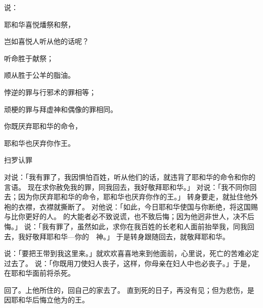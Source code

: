 {说：
\par }{\Q 耶和华喜悦燔祭和{}祭，
\par }{\Q 岂如喜悦人听从他的话呢？
\par }{\Q 听命胜于献祭；
\par }{\Q 顺从胜于公羊的脂油。
\par }{\Q {}悖逆的罪与行邪术的罪相等；
\par }{\Q 顽梗的罪与拜虚神和偶像的罪相同。
\par }{\Q 你既厌弃耶和华的命令，
\par }{\Q 耶和华也厌弃你作王。
\par }{\SH 扫罗认罪
\par }{\PP {}对{}说：「我有罪了，我因惧怕百姓，听从他们的话，就违背了耶和华的命令和你的言语。
现在求你赦免我的罪，同我回去，我好敬拜耶和华。」
对{}说：「我不同你回去；因为你厌弃耶和华的命令，耶和华也厌弃你作{}的王。」
转身要走，{}就扯住他外袍的衣襟，衣襟就撕断了。
对他说：「如此，今日耶和华使{}国与你断绝，将这国赐与比你更好的人。
的大能者必不致说谎，也不致后悔；因为他迥非世人，决不后悔。」
说：「我有罪了，虽然如此，求你在我百姓的长老和{}人面前抬举我，同我回去，我好敬拜耶和华—你的　神。」
于是{}转身跟随{}回去，{}就敬拜耶和华。
\par }{\PP {}说：「要把{}王{}带到我这里来。」{}就欢欢喜喜地来到他面前，心里说，死亡的苦难必定过去了。
说：「你既用刀使妇人丧子，这样，你母亲在妇人中也必丧子。」于是，{}在{}耶和华面前将{}杀死。
\par }{\PP {}回了{}。{}上他所住的{}，回自己的家去了。
直到死的日子，再没有见{}；但{}为{}悲伤，是因耶和华后悔立他为{}的王。

}
